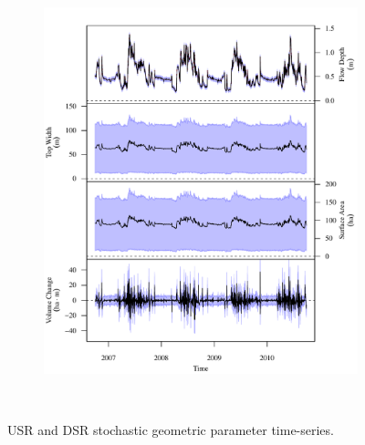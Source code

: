 \begin{landscape}
	\begin{figure}
		\begin{subfigure}{0.7\textwidth}
			\centering
			\includegraphics[width=\tableCustomSize]{"Figures/Results_USR/Stochastic/G TS E"}
		\end{subfigure}\\
		\caption[]{USR and DSR stochastic geometric parameter time-series.}
	\end{figure}
\end{landscape}

